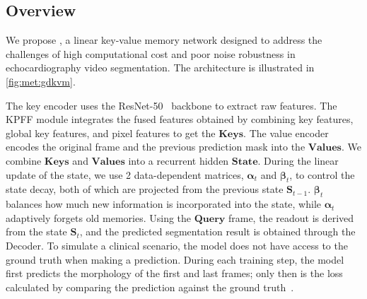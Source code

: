 \subsection{Overview}
    \label{subsec:overview}
We propose \textbf{\mymodel}, a linear key-value memory network designed to address the challenges of high computational cost and poor noise robustness in echocardiography video segmentation. 
The architecture is illustrated in \cref{fig:met:gdkvm}.

The key encoder uses the ResNet-50~\cite{he2015deepresiduallearningimage} backbone to extract raw features. 
The KPFF module integrates the fused features obtained by combining key features, global key features, and pixel features to get the $\mathbf{Keys}$. 
The value encoder encodes the original frame and the previous prediction mask into the $\mathbf{Values}$. We combine $\mathbf{Keys}$ and $\mathbf{Values}$ into a recurrent hidden $\mathbf{State}$.
During the linear update of the state, we use 2 data-dependent matrices, $\boldsymbol{\alpha}_t$ and $\boldsymbol{\beta}_t$, to control the state decay, both of which are projected from the previous state $\mathbf{S}_{t-1}$. $\boldsymbol{\beta}_t$ balances how much new information is incorporated into the state, while $\boldsymbol{\alpha}_t$ adaptively forgets old memories.
Using the $\mathbf{Query}$ frame, the readout is derived from the state $\mathbf{S}_t$, and the predicted segmentation result is obtained through the Decoder.
To simulate a clinical scenario, the model does not have access to the ground truth when making a prediction. During each training step, the model first predicts the morphology of the first and last frames; only then is the loss calculated by comparing the prediction against the ground truth~\cite{deng2024memsam}.